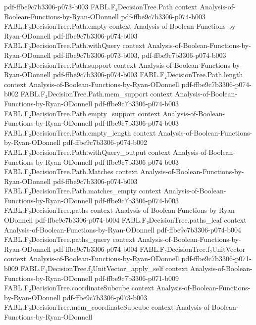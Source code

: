 \begin{theorem}
  {pdf-ffbe9c7b3306-p073-b003}
\proofstep
  {FABL.F₂DecisionTree.Path}
  {context}
  {Analysis-of-Boolean-Functions-by-Ryan-ODonnell}
  {pdf-ffbe9c7b3306-p074-b003}
\proofstep
  {FABL.F₂DecisionTree.Path.empty}
  {context}
  {Analysis-of-Boolean-Functions-by-Ryan-ODonnell}
  {pdf-ffbe9c7b3306-p074-b003}
\proofstep
  {FABL.F₂DecisionTree.Path.withQuery}
  {context}
  {Analysis-of-Boolean-Functions-by-Ryan-ODonnell}
  {pdf-ffbe9c7b3306-p073-b003,
    pdf-ffbe9c7b3306-p074-b003}
\proofstep
  {FABL.F₂DecisionTree.Path.support}
  {context}
  {Analysis-of-Boolean-Functions-by-Ryan-ODonnell}
  {pdf-ffbe9c7b3306-p074-b003}
\proofstep
  {FABL.F₂DecisionTree.Path.length}
  {context}
  {Analysis-of-Boolean-Functions-by-Ryan-ODonnell}
  {pdf-ffbe9c7b3306-p074-b002}
\proofstep
  {FABL.F₂DecisionTree.Path.mem_support}
  {context}
  {Analysis-of-Boolean-Functions-by-Ryan-ODonnell}
  {pdf-ffbe9c7b3306-p074-b003}
\proofstep
  {FABL.F₂DecisionTree.Path.empty_support}
  {context}
  {Analysis-of-Boolean-Functions-by-Ryan-ODonnell}
  {pdf-ffbe9c7b3306-p074-b003}
\proofstep
  {FABL.F₂DecisionTree.Path.empty_length}
  {context}
  {Analysis-of-Boolean-Functions-by-Ryan-ODonnell}
  {pdf-ffbe9c7b3306-p074-b002}
\proofstep
  {FABL.F₂DecisionTree.Path.withQuery_output}
  {context}
  {Analysis-of-Boolean-Functions-by-Ryan-ODonnell}
  {pdf-ffbe9c7b3306-p074-b003}
\proofstep
  {FABL.F₂DecisionTree.Path.Matches}
  {context}
  {Analysis-of-Boolean-Functions-by-Ryan-ODonnell}
  {pdf-ffbe9c7b3306-p074-b003}
\proofstep
  {FABL.F₂DecisionTree.Path.matches_empty}
  {context}
  {Analysis-of-Boolean-Functions-by-Ryan-ODonnell}
  {pdf-ffbe9c7b3306-p074-b003}
\proofstep
  {FABL.F₂DecisionTree.paths}
  {context}
  {Analysis-of-Boolean-Functions-by-Ryan-ODonnell}
  {pdf-ffbe9c7b3306-p074-b004}
\proofstep
  {FABL.F₂DecisionTree.paths_leaf}
  {context}
  {Analysis-of-Boolean-Functions-by-Ryan-ODonnell}
  {pdf-ffbe9c7b3306-p074-b004}
\proofstep
  {FABL.F₂DecisionTree.paths_query}
  {context}
  {Analysis-of-Boolean-Functions-by-Ryan-ODonnell}
  {pdf-ffbe9c7b3306-p074-b004}
\proofstep
  {FABL.F₂DecisionTree.f₂UnitVector}
  {context}
  {Analysis-of-Boolean-Functions-by-Ryan-ODonnell}
  {pdf-ffbe9c7b3306-p071-b009}
\proofstep
  {FABL.F₂DecisionTree.f₂UnitVector_apply_self}
  {context}
  {Analysis-of-Boolean-Functions-by-Ryan-ODonnell}
  {pdf-ffbe9c7b3306-p071-b009}
\proofstep
  {FABL.F₂DecisionTree.coordinateSubcube}
  {context}
  {Analysis-of-Boolean-Functions-by-Ryan-ODonnell}
  {pdf-ffbe9c7b3306-p073-b003}
\proofstep
  {FABL.F₂DecisionTree.mem_coordinateSubcube}
  {context}
  {Analysis-of-Boolean-Functions-by-Ryan-ODonnell}

\end{theorem}

